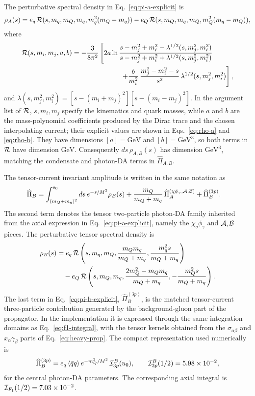 \documentclass[aps,prd,preprint,nofootinbib,superscriptaddress]{revtex4-2}
\newcommand{\GeV}{\mathrm{GeV}}
\newcommand{\qqbar}{\langle\bar q q\rangle}
\begin{document}
The perturbative spectral density in Eq.~\eqref{eq:pi-a-explicit} is
\begin{equation}
  \rho_A(s)=e_q\,{\cal R}(s,m_q,m_Q,m_q,m_q^2(m_Q-m_q))
  -e_Q\,{\cal R}(s,m_Q,m_q,m_Q,m_Q^2(m_q-m_Q)),
  \label{eq:rho-a}
\end{equation}
where
\begin{align}
  {\cal R}(s,m_i,m_j,a,b)
  &=
  -\frac{3}{8\pi^2}
  \left[
  2a\ln\frac{s-m_j^2+m_i^2-\lambda^{1/2}(s,m_j^2,m_i^2)}
          {s-m_j^2+m_i^2+\lambda^{1/2}(s,m_j^2,m_i^2)}
  \right.
  \notag\\
  &\hspace{2.5cm}\left.
  +\frac{b}{m_i^2}\,
  \frac{m_j^2-m_i^2-s}{s^2}\,
  \lambda^{1/2}(s,m_j^2,m_i^2)
  \right],
  \label{eq:r-kernel}
\end{align}
and $\lambda(s,m_j^2,m_i^2)=[s-(m_i+m_j)^2][s-(m_i-m_j)^2]$.  In the argument
list of ${\cal R}$, $s,m_i,m_j$ specify the kinematics and quark masses, while
$a$ and $b$ are the mass-polynomial coefficients produced by the Dirac trace and
the chosen interpolating current; their explicit values are shown in
Eqs.~\eqref{eq:rho-a} and \eqref{eq:rho-b}.  They have dimensions
$[a]=\GeV$ and $[b]=\GeV^3$, so both terms in ${\cal R}$ have dimension
$\GeV$.  Consequently $ds\,\rho_{A,B}(s)$ has dimension $\GeV^3$, matching the
condensate and photon-DA terms in $\widehat\Pi_{A,B}$.

The tensor-current invariant amplitude is written in the same notation as
\begin{align}
  \widehat\Pi_B
  &=
  \int_{(m_Q+m_q)^2}^{s_0}ds\,e^{-s/M^2}\rho_B(s)
  +\frac{m_Q}{m_Q+m_q}\,
  \widehat\Pi_A^{(\chi\phi_\gamma,{\cal A},{\cal B})}
  +\widehat\Pi_B^{(3p)} .
  \label{eq:pi-b-explicit}
\end{align}
The second term denotes the tensor two-particle photon-DA family inherited from
the axial expression in Eq.~\eqref{eq:pi-a-explicit}, namely the
$\chi_q\phi_\gamma$ and ${\cal A},{\cal B}$ pieces.  The perturbative
tensor spectral density is
\begin{align}
  \rho_B(s)
  &=
  e_q\,{\cal R}\left(
    s,m_q,m_Q,
    \frac{m_Q m_q}{m_Q+m_q},
    \frac{m_q^2 s}{m_Q+m_q}
  \right)
  \notag\\
  &\quad
  -e_Q\,{\cal R}\left(
    s,m_Q,m_q,
    \frac{2m_Q^2-m_Q m_q}{m_Q+m_q},
    -\frac{m_Q^2 s}{m_Q+m_q}
  \right).
  \label{eq:rho-b}
\end{align}
The last term in Eq.~\eqref{eq:pi-b-explicit}, $\widehat\Pi_B^{(3p)}$, is the
matched tensor-current three-particle contribution generated by the
background-gluon part of the propagator.  In the implementation it is expressed
through the same integration domains as Eq.~\eqref{eq:f1-integral}, with the
tensor kernels obtained from the $\sigma_{\alpha\beta}$ and
$x_\alpha\gamma_\beta$ parts of Eq.~\eqref{eq:heavy-prop}.  The compact
representation used numerically is
\begin{equation}
  \widehat\Pi_B^{(3p)}
  =
  e_q\,\qqbar\,e^{-m_Q^2/M^2}\,
  {\cal I}^{B}_{3p}(u_0),
  \qquad
  {\cal I}^{B}_{3p}(1/2)=5.98\times10^{-2},
  \label{eq:pi-b-3p}
\end{equation}
for the central photon-DA parameters.  The corresponding axial integral is
${\cal I}_{F_1}(1/2)=7.03\times10^{-2}$.
\end{document}
